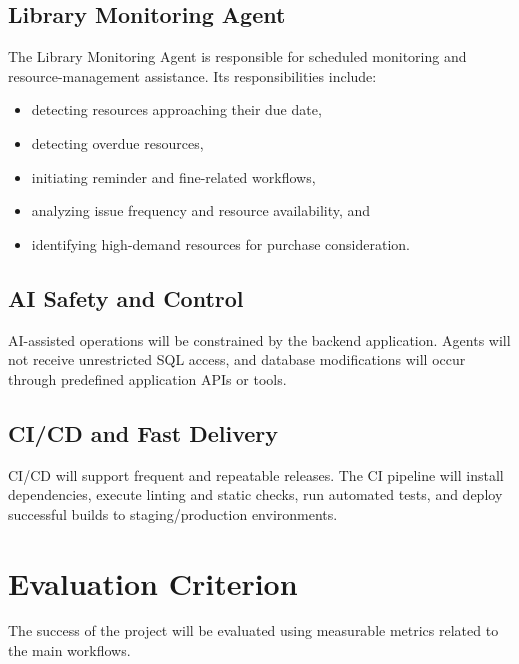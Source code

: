 \documentclass[11pt,a4paper]{article}
\begin{document}
\subsection{Library Monitoring Agent}
The Library Monitoring Agent is responsible for scheduled monitoring and resource-management assistance. Its responsibilities include:
\begin{itemize}
    \item detecting resources approaching their due date,
    \item detecting overdue resources,
    \item initiating reminder and fine-related workflows,
    \item analyzing issue frequency and resource availability, and
    \item identifying high-demand resources for purchase consideration.
\end{itemize}

\subsection{AI Safety and Control}
AI-assisted operations will be constrained by the backend application. Agents will not receive unrestricted SQL access, and database modifications will occur through predefined application APIs or tools.

\subsection{CI/CD and Fast Delivery}
CI/CD will support frequent and repeatable releases. The CI pipeline will install dependencies, execute linting and static checks, run automated tests, and deploy successful builds to staging/production environments.

\section{Evaluation Criterion}
The success of the project will be evaluated using measurable metrics related to the main workflows.
\end{document}

